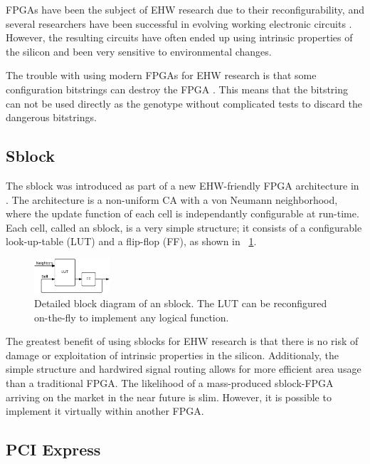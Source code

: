 FPGAs have been the subject of EHW research due to their reconfigurability, and several researchers have been successful in evolving working electronic circuits \cite{huelsbergen1998evolution} \cite{thompson1997evolved}.
However, the resulting circuits have often ended up using intrinsic properties of the silicon and been very sensitive to environmental changes.

The trouble with using modern FPGAs for EHW research is that some configuration bitstrings can destroy the FPGA \cite{ug380} \cite{xapp151}.
This means that the bitstring can not be used directly as the genotype without complicated tests to discard the dangerous bitstrings.

\subsection{Sblock}

The sblock was introduced as part of a new EHW-friendly FPGA architecture in \cite{haddow2000sblock}.
The architecture is a non-uniform CA with a von Neumann neighborhood, where the update function of each cell is independantly configurable at run-time.
Each cell, called an sblock, is a very simple structure; it consists of a configurable look-up-table (LUT) and a flip-flop (FF), as shown in \figurename~\ref{fig:sblock}.

\begin{figure}[!ht]
    \centering
    \includegraphics[width=0.25\textwidth]{figures/sblock}
    \caption{Detailed block diagram of an sblock. The LUT can be reconfigured on-the-fly to implement any logical function.}
    \label{fig:sblock}
\end{figure}

The greatest benefit of using sblocks for EHW research is that there is no risk of damage or exploitation of intrinsic properties in the silicon.
Additionaly, the simple structure and hardwired signal routing allows for more efficient area usage than a traditional FPGA.
The likelihood of a mass-produced sblock-FPGA arriving on the market in the near future is slim.
However, it is possible to implement it virtually within another FPGA.

\subsection{PCI Express}

